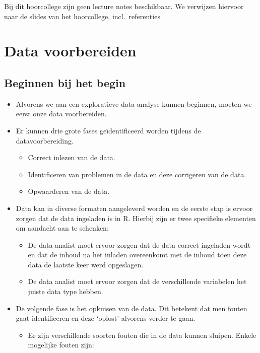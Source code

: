 \documentclass[]{tufte-book}
\providecommand{\tightlist}{%
  \setlength{\itemsep}{0pt}\setlength{\parskip}{0pt}}
\begin{document}
Bij dit hoorcollege zijn geen lecture notes beschikbaar. We verwijzen hiervoor naar de slides van het hoorcollege, incl.~referenties

\hypertarget{data-voorbereiden}{%
\chapter{Data voorbereiden}\label{data-voorbereiden}}

\hypertarget{beginnen-bij-het-begin}{%
\section{Beginnen bij het begin}\label{beginnen-bij-het-begin}}

\begin{itemize}
\tightlist
\item
  Alvorens we aan een exploratieve data analyse kunnen beginnen, moeten we eerst onze data voorbereiden.
\item
  Er kunnen drie grote fases geïdentificeerd worden tijdens de datavoorbereiding.

  \begin{itemize}
  \tightlist
  \item
    Correct inlezen van de data.
  \item
    Identificeren van problemen in de data en deze corrigeren van de data.
  \item
    Opwaarderen van de data.
  \end{itemize}
\item
  Data kan in diverse formaten aangeleverd worden en de eerste stap is ervoor zorgen dat de data ingeladen is in R. Hierbij zijn er twee specifieke elementen om aandacht aan te schenken:

  \begin{itemize}
  \tightlist
  \item
    De data analist moet ervoor zorgen dat de data correct ingeladen wordt en dat de inhoud na het inladen overeenkomt met de inhoud toen deze data de laatste keer werd opgeslagen.
  \item
    De data analist moet ervoor zorgen dat de verschillende variabelen het juiste data type hebben.
  \end{itemize}
\item
  De volgende fase is het opkuisen van de data. Dit betekent dat men fouten gaat identificeren en deze `oplost' alvorens verder te gaan.

  \begin{itemize}
  \tightlist
  \item
    Er zijn verschillende soorten fouten die in de data kunnen sluipen. Enkele mogelijke fouten zijn:


\end{itemize}
\end{itemize}
\end{document}
